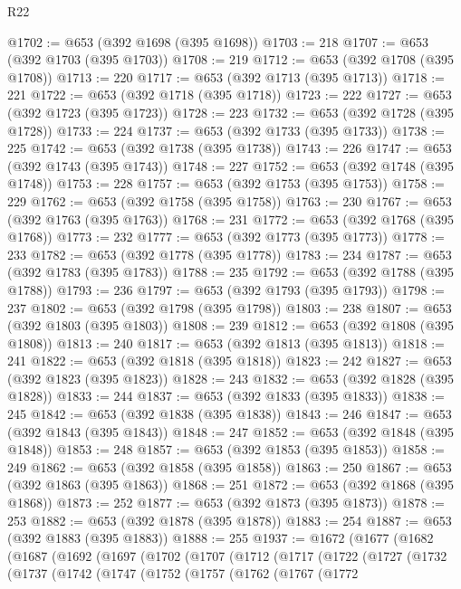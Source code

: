 \begin{lexlean}{R22}
\begin{coremodule}
@1702 := @653 (@392 @1698 (@395 @1698))
@1703 := 218
@1707 := @653 (@392 @1703 (@395 @1703))
@1708 := 219
@1712 := @653 (@392 @1708 (@395 @1708))
@1713 := 220
@1717 := @653 (@392 @1713 (@395 @1713))
@1718 := 221
@1722 := @653 (@392 @1718 (@395 @1718))
@1723 := 222
@1727 := @653 (@392 @1723 (@395 @1723))
@1728 := 223
@1732 := @653 (@392 @1728 (@395 @1728))
@1733 := 224
@1737 := @653 (@392 @1733 (@395 @1733))
@1738 := 225
@1742 := @653 (@392 @1738 (@395 @1738))
@1743 := 226
@1747 := @653 (@392 @1743 (@395 @1743))
@1748 := 227
@1752 := @653 (@392 @1748 (@395 @1748))
@1753 := 228
@1757 := @653 (@392 @1753 (@395 @1753))
@1758 := 229
@1762 := @653 (@392 @1758 (@395 @1758))
@1763 := 230
@1767 := @653 (@392 @1763 (@395 @1763))
@1768 := 231
@1772 := @653 (@392 @1768 (@395 @1768))
@1773 := 232
@1777 := @653 (@392 @1773 (@395 @1773))
@1778 := 233
@1782 := @653 (@392 @1778 (@395 @1778))
@1783 := 234
@1787 := @653 (@392 @1783 (@395 @1783))
@1788 := 235
@1792 := @653 (@392 @1788 (@395 @1788))
@1793 := 236
@1797 := @653 (@392 @1793 (@395 @1793))
@1798 := 237
@1802 := @653 (@392 @1798 (@395 @1798))
@1803 := 238
@1807 := @653 (@392 @1803 (@395 @1803))
@1808 := 239
@1812 := @653 (@392 @1808 (@395 @1808))
@1813 := 240
@1817 := @653 (@392 @1813 (@395 @1813))
@1818 := 241
@1822 := @653 (@392 @1818 (@395 @1818))
@1823 := 242
@1827 := @653 (@392 @1823 (@395 @1823))
@1828 := 243
@1832 := @653 (@392 @1828 (@395 @1828))
@1833 := 244
@1837 := @653 (@392 @1833 (@395 @1833))
@1838 := 245
@1842 := @653 (@392 @1838 (@395 @1838))
@1843 := 246
@1847 := @653 (@392 @1843 (@395 @1843))
@1848 := 247
@1852 := @653 (@392 @1848 (@395 @1848))
@1853 := 248
@1857 := @653 (@392 @1853 (@395 @1853))
@1858 := 249
@1862 := @653 (@392 @1858 (@395 @1858))
@1863 := 250
@1867 := @653 (@392 @1863 (@395 @1863))
@1868 := 251
@1872 := @653 (@392 @1868 (@395 @1868))
@1873 := 252
@1877 := @653 (@392 @1873 (@395 @1873))
@1878 := 253
@1882 := @653 (@392 @1878 (@395 @1878))
@1883 := 254
@1887 := @653 (@392 @1883 (@395 @1883))
@1888 := 255
@1937 := @1672
    (@1677
      (@1682
        (@1687
          (@1692
            (@1697
              (@1702
                (@1707
                  (@1712
                    (@1717
                      (@1722
                        (@1727
                          (@1732
                            (@1737
                              (@1742
                                (@1747
                                  (@1752
                                    (@1757
                                      (@1762
                                        (@1767
                                          (@1772

\end{coremodule}
\end{lexlean}

